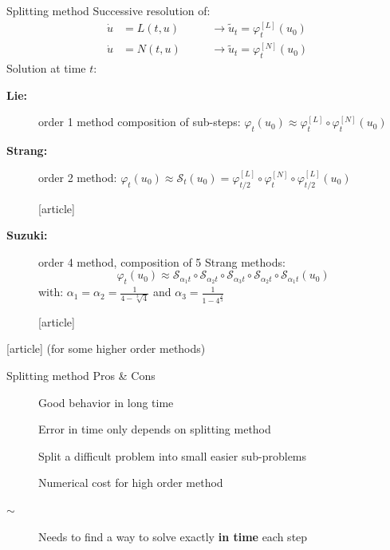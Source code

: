 \documentclass{beamer}
\newcommand{\cmark}{{\color{dgreen}\ding{52}}}
\newcommand{\xmark}{{\color{red}\ding{55}}}
\newcommand{\bmark}{{\color{orange}$\sim$}}
\newcommand{\mbold}[1]{{\textbf{\color{PLB}#1}}}
\newcommand{\customcite}[1]{\cite{#1}}
\begin{document}
\begin{frame}{Splitting method}
  Successive resolution of:
  $$
    \begin{aligned}
      \dot{u} &= L(t,u) \qquad & \rightarrow \tilde{u}_t = \varphi^{[L]}_t(u_0) \\
      \dot{u} &= N(t,u)        & \rightarrow \tilde{u}_t = \varphi^{[N]}_t(u_0)
    \end{aligned}
  $$
  Solution at time $t$:
  \begin{description}
    \item[\mbold{Lie:}] order 1 method composition of sub-steps:
        $\varphi_t(u_0) \approx \varphi_t^{[L]} \circ \varphi_t^{[N]}(u_0)$
    \item[\mbold{Strang:}] order 2 method:
        $\varphi_t(u_0) \approx \mathcal{S}_t(u_0) = \varphi_{t/2}^{[L]} \circ \varphi_t^{[N]} \circ \varphi_{t/2}^{[L]} (u_0)$
        \vspace{-0.25cm}
        \begin{thebibliography}{9}
          [article]
           \customcite{Strang:1968}
        \end{thebibliography}
    \item[\mbold{Suzuki:}] order 4 method, composition of 5 Strang methods:
        $$\varphi_t(u_0) \approx \mathcal{S}_{\alpha_1t}\circ\mathcal{S}_{\alpha_2t}\circ\mathcal{S}_{\alpha_3t}\circ\mathcal{S}_{\alpha_2t}\circ\mathcal{S}_{\alpha_1t}(u_0)$$
        with:
        $\alpha_1 = \alpha_2 = \frac{1}{4-\sqrt[3]{4}}$ and $\alpha_3 = \frac{1}{1-4^{\frac{2}{3}}}$
        \vspace{-0.25cm}
        \begin{thebibliography}{9}
          [article]
           \customcite{Suzuki:1990}
        \end{thebibliography}
  \end{description}

  \vspace{-0.25cm}
  \begin{thebibliography}{9}
    [article]
     \customcite{Casas:2020} \textcolor{defaultcolor}{(for some higher order methods)}
  \end{thebibliography}
\end{frame}
\begin{frame}{Splitting method}
  {Pros \& Cons}
  \begin{description}
    \item[\cmark] Good behavior in long time
    \item[\cmark] Error in time only depends on splitting method
    \item[\cmark] Split a difficult problem into small easier sub-problems
    \item[\xmark] Numerical cost for high order method
    \item[\bmark] Needs to find a way to solve exactly \mbold{in time} each step
  \end{description}
  
\end{frame}
\end{document}
